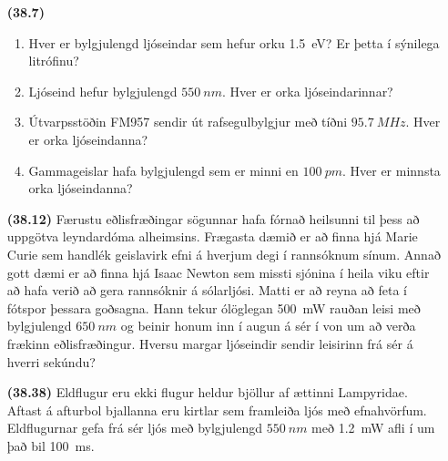 \ifdefined \wholebook \else\documentclass[oneside]{book}\usepackage{EdlBook}\graphicspath{{figures/}}
\begin{document}
\begin{enumerate}[label = \textbf{(\alph*)}]

\item[\textbf{(38.7)}] 
\begin{enumerate}[label = \textbf{(\alph*)}]
\item Hver er bylgjulengd ljóseindar sem hefur orku \SI{1.5}{eV}? Er þetta í sýnilega litrófinu?
\item Ljóseind hefur bylgjulengd $\SI{550}{nm}$. Hver er orka ljóseindarinnar?
\item Útvarpsstöðin FM957 sendir út rafsegulbylgjur með tíðni $\SI{95.7}{MHz}$. Hver er orka ljóseindanna?
\item Gammageislar hafa bylgjulengd sem er minni en $\SI{100}{pm}$. Hver er minnsta orka ljóseindanna?
\end{enumerate}

\item[\textbf{(38.12)}] Færustu eðlisfræðingar sögunnar hafa fórnað heilsunni til þess að uppgötva leyndardóma alheimsins. Frægasta dæmið er að finna hjá Marie Curie sem handlék geislavirk efni á hverjum degi í rannsóknum sínum. Annað gott dæmi er að finna hjá Isaac Newton sem missti sjónina í heila viku eftir að hafa verið að gera rannsóknir á sólarljósi. Matti er að reyna að feta í fótspor þessara goðsagna. Hann tekur ólöglegan \SI{500}{mW} rauðan leisi með bylgjulengd $\SI{650}{nm}$ og beinir honum inn í augun á sér í von um að verða frækinn eðlisfræðingur. Hversu margar ljóseindir sendir leisirinn frá sér á hverri sekúndu?


\item[\textbf{(38.38)}] Eldflugur eru ekki flugur heldur bjöllur af ættinni Lampyridae. Aftast á afturbol bjallanna eru kirtlar sem framleiða ljós með efnahvörfum. Eldflugurnar gefa frá sér ljós með bylgjulengd $\SI{550}{nm}$ með \SI{1.2}{mW} afli í um það bil \SI{100}{ms}. 

\end{enumerate}
\end{document}

